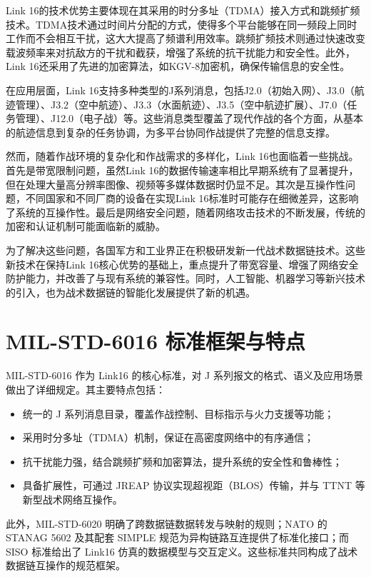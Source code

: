 Link 16的技术优势主要体现在其采用的时分多址（TDMA）接入方式和跳频扩频技术。TDMA技术通过时间片分配的方式，使得多个平台能够在同一频段上同时工作而不会相互干扰，这大大提高了频谱利用效率。跳频扩频技术则通过快速改变载波频率来对抗敌方的干扰和截获，增强了系统的抗干扰能力和安全性。此外，Link 16还采用了先进的加密算法，如KGV-8加密机，确保传输信息的安全性。

在应用层面，Link 16支持多种类型的J系列消息，包括J2.0（初始入网）、J3.0（航迹管理）、J3.2（空中航迹）、J3.3（水面航迹）、J3.5（空中航迹扩展）、J7.0（任务管理）、J12.0（电子战）等。这些消息类型覆盖了现代作战的各个方面，从基本的航迹信息到复杂的任务协调，为多平台协同作战提供了完整的信息支撑。

然而，随着作战环境的复杂化和作战需求的多样化，Link 16也面临着一些挑战。首先是带宽限制问题，虽然Link 16的数据传输速率相比早期系统有了显著提升，但在处理大量高分辨率图像、视频等多媒体数据时仍显不足。其次是互操作性问题，不同国家和不同厂商的设备在实现Link 16标准时可能存在细微差异，这影响了系统的互操作性。最后是网络安全问题，随着网络攻击技术的不断发展，传统的加密和认证机制可能面临新的威胁。

为了解决这些问题，各国军方和工业界正在积极研发新一代战术数据链技术。这些新技术在保持Link 16核心优势的基础上，重点提升了带宽容量、增强了网络安全防护能力，并改善了与现有系统的兼容性。同时，人工智能、机器学习等新兴技术的引入，也为战术数据链的智能化发展提供了新的机遇。

\section{MIL-STD-6016 标准框架与特点}
MIL-STD-6016 作为 {Link16} 的核心标准，对 J 系列报文的格式、语义及应用场景做出了详细规定\cite{ASSIST_6016_2024,CJCSM_6235_01_2025}。其主要特点包括：  
\begin{itemize}
  \item 统一的 J 系列消息目录，覆盖作战控制、目标指示与火力支援等功能；  
  \item 采用时分多址（TDMA）机制，保证在高密度网络中的有序通信；  
  \item 抗干扰能力强，结合跳频扩频和加密算法，提升系统的安全性和鲁棒性；  
  \item 具备扩展性，可通过 {JREAP} 协议实现超视距（BLOS）传输，并与 {TTNT} 等新型战术网络互操作。  
\end{itemize}

此外，MIL-STD-6020 明确了跨数据链数据转发与映射的规则；NATO 的 STANAG 5602 及其配套 SIMPLE 规范为异构链路互连提供了标准化接口；而 SISO 标准给出了 {Link16} 仿真的数据模型与交互定义\cite{Ultra_MDLMS_2021}。这些标准共同构成了战术数据链互操作的规范框架。


